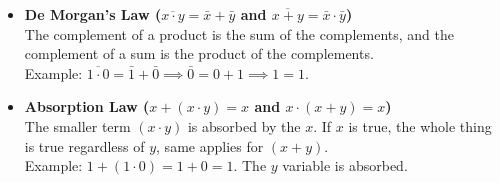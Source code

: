 \begin{itemize}
    \item \textbf{De Morgan’s Law ($\overline{x \cdot y} = \bar{x} + \bar{y}$ and $\overline{x + y} = \bar{x} \cdot \bar{y}$)} \\
    The complement of a product is the sum of the complements, and the complement of a sum is the product of the complements. \\
    Example: $\overline{1 \cdot 0} = \bar{1} + \bar{0} \implies \bar{0} = 0 + 1 \implies 1 = 1$.
    
    \item \textbf{Absorption Law ($x + (x \cdot y) = x$ and $x \cdot (x + y) = x$)} \\
    The smaller term $(x \cdot y)$ is absorbed by the $x$. If $x$ is true, the whole thing is true regardless of $y$, same applies for $(x + y)$. \\
    Example: $1 + (1 \cdot 0) = 1 + 0 = 1$. The $y$ variable is absorbed.
\end{itemize}